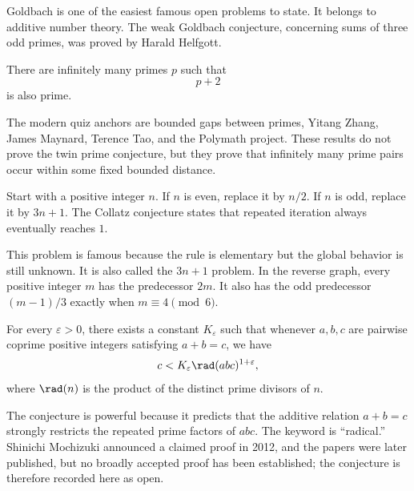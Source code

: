     \begin{remark}
        Goldbach is one of the easiest famous open problems to state. It belongs
        to additive number theory. The weak Goldbach conjecture, concerning sums
        of three odd primes, was proved by Harald Helfgott.
    \end{remark}

    \begin{openproblem}
        There are infinitely many primes $p$ such that
        \[
            p+2
        \]
        is also prime.
    \end{openproblem}

    \begin{remark}
        The modern quiz anchors are bounded gaps between primes, Yitang Zhang,
        James Maynard, Terence Tao, and the Polymath project. These results do
        not prove the twin prime conjecture, but they prove that infinitely many
        prime pairs occur within some fixed bounded distance.
    \end{remark}

    \begin{openproblem}
        Start with a positive integer $n$. If $n$ is even, replace it by $n/2$.
        If $n$ is odd, replace it by $3n+1$. The Collatz conjecture states that
        repeated iteration always eventually reaches $1$.
    \end{openproblem}

    \begin{remark}
        This problem is famous because the rule is elementary but the global
        behavior is still unknown. It is also called the $3n+1$ problem. In the
        reverse graph, every positive integer $m$ has the predecessor $2m$.
        It also has the odd predecessor $(m-1)/3$ exactly when
        $m\equiv4\pmod6$.
    \end{remark}

    \begin{conjecture}
        For every $\varepsilon>0$, there exists a constant $K_{\varepsilon}$ such that whenever $a,b,c$ are pairwise coprime positive integers satisfying
        $a+b=c$, we have
        \[
            c<K_{\varepsilon} \rad(abc)^{1+\varepsilon},
        \]
        where $\rad(n)$ is the product of the distinct prime
        divisors of $n$.
    \end{conjecture}

    \begin{remark}
        The conjecture is powerful because it predicts that the additive
        relation $a+b=c$ strongly restricts the repeated prime factors of
        $abc$. The keyword is ``radical.'' Shinichi Mochizuki announced a
        claimed proof in 2012, and the papers were later published, but no
        broadly accepted proof has been established; the conjecture is
        therefore recorded here as open.
    \end{remark}

